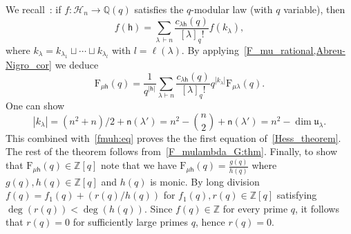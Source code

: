 \documentclass[12pt,a4paper,reqno]{amsart}
\theoremstyle{plain}
\theoremstyle{definition}
\newcommand{\ZZ}{{\mathbb{Z}}}
\newcommand{\QQ}{{\mathbb{Q}}}
\newcommand{\1}{\mathds{1}}
\newcommand{\F}{\mathrm{F}}
\renewcommand{\u}{\mathfrak{u}}
\newcommand{\fn}{\mathsf{n}}
\newcommand{\hes}{\mathsf{h}}
\begin{document}
We recall~\cite[Cor.~3.2]{Abreu-Nigro}: if $f:\mathcal{H}_n\to\QQ(q)$ satisfies the $q$-modular law (with $q$ variable), then
\begin{equation}\label{Abreu-Nigro_cor}
    f(\hes)=\sum_{\lambda\, \vdash n} \frac{c_{\lambda\hes}(q)}{[\lambda]_q!}f(k_\lambda),
\end{equation} 
where $k_\lambda=k_{\lambda_1}\sqcup\cdots\sqcup k_{\lambda_l}$ with $l=\ell(\lambda)$. By applying~\cref{F_mu_rational,Abreu-Nigro_cor} we deduce 
\begin{equation}\label{fmuh:eq}
    \F_{\mu\hes}(q)=\frac{1}{q^{|\hes|}}\sum_{\lambda\vdash n}\frac{c_{\lambda\hes}(q)}{[\lambda]_q!}q^{|k_\lambda|}\F_{\mu\lambda}(q).
\end{equation}
One can show 
$$|k_\lambda|=(n^2+n)/2+\fn(\lambda')=n^2-\binom{n}{2}+\fn(\lambda')=n^2-\dim\u_\lambda.$$
This combined with~\cref{fmuh:eq} proves the the first equation of~\cref{Hess_theorem}. The rest of the theorem follows from~\cref{F_mulambda_G:thm}. 
Finally, to show that $\F_{\mu\hes}(q) \in \ZZ[q]$ note that we have $\F_{\mu\hes}(q) = \frac{g(q)}{h(q)}$ where $g(q), h(q) \in \ZZ[q]$ and $h(q)$ is monic. By long division  $f(q)=f_1(q)+(r(q)/h(q))$ for $f_1(q),r(q)\in\ZZ[q]$ satisfying $\deg(r(q))<\deg(h(q))$. Since $f(q)\in\ZZ$ for every prime $q$, it follows that $r(q)=0$ for sufficiently large primes $q$, hence $r(q)=0$.
\end{document}
